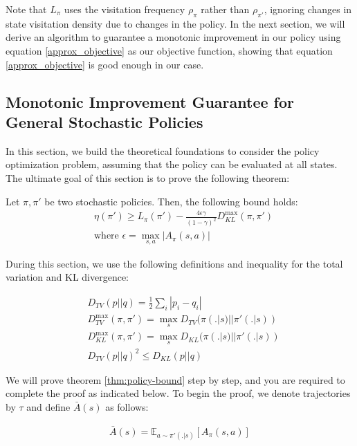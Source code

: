 Note that $L_{\pi}$ uses the visitation frequency $\rho_{\pi}$ rather than $\rho_{\pi'}$, ignoring changes in state visitation density due to changes in the policy. In the next section, we will derive an algorithm to guarantee a monotonic improvement in our policy using equation \ref{approx_objective} as our objective function, showing that equation \ref{approx_objective} is good enough in our case.

\subsection{Monotonic Improvement Guarantee for General Stochastic Policies}

In this section, we build the theoretical foundations to consider the policy optimization problem, assuming that the policy can be evaluated at all states. The ultimate goal of this section is to prove the following theorem:

\begin{theorem}\label{thm:policy-bound}
    Let $\pi, \pi'$ be two stochastic policies. Then, the following bound holds:
    \begin{align*}
    &\eta(\pi') \ge L_{\pi}(\pi') - \frac{4\epsilon\gamma}{(1-\gamma)^2}D_{KL}^{\max}(\pi, \pi') \\
    &\text{where } \epsilon = \max_{s, a} |A_{\pi}(s, a)|
    \end{align*}
\end{theorem}

During this section, we use the following definitions and inequality for the total variation and KL divergence:

\begin{align*}
    &D_{TV}(p||q) = \frac{1}{2}\sum_{i}|p_i - q_i| \\
    &D_{TV}^{\max}(\pi, \pi') = \max_{s} D_{TV}(\pi(.|s)||\pi'(.|s))\\
    &D_{KL}^{\max}(\pi, \pi') = \max_{s} D_{KL}(\pi(.|s)||\pi'(.|s))\\
    &D_{TV}(p||q)^2 \le D_{KL}(p||q)
\end{align*}

We will prove theorem \ref{thm:policy-bound} step by step, and you are required to complete the proof as indicated below. To begin the proof, we denote trajectories by $\tau$ and define $\bar{A}(s)$ as follows:

\begin{align*}
    \bar{A}(s) = \mathbb{E}_{a \sim \pi'(.|s)}[A_{\pi}(s, a)]
\end{align*}

